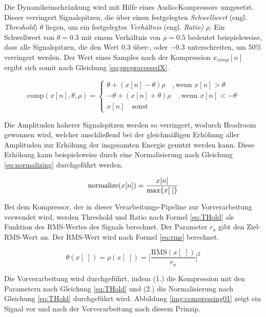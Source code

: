 Die Dynamikeinschränkung wird mit Hilfe eines Audio-Kompressors umgesetzt. Dieser verringert Signalspitzen, die über einen festgelegten \emph{Schwellwert} (engl. \emph{Threshold}) $\theta$ liegen, um ein festgelegtes \emph{Verhältnis} (engl. \emph{Ratio)} $\rho$. Ein Schwellwert von $\theta = 0.3$ mit einem Verhältnis von $\rho = 0.5$ bedeutet beispielsweise, dass alle Signalspitzen, die den Wert 0.3 über-, oder $-0.3$ unterschreiten, um 50\% verringert werden. Der Wert eines Samples nach der Kompression $x_{comp}[n]$ ergibt sich somit nach Gleichung \ref{eq:preprocessedX}.

\begin{equation}
\text{comp}(x[n], \theta, \rho) =
\begin{cases}
\theta + (x[n] - \theta) \rho \quad , \text{wenn } x[n] > \theta \\
-\theta + (x[n] + \theta) \rho \quad, \text{wenn } x[n] < -\theta \\
x[n] \quad \text{sonst}
\end{cases}
\label{eq:preprocessedX}
\end{equation}

Die Amplituden hoherer Signalspitzen werden so verringert, wodurch Headroom gewonnen wird, welcher anschließend bei der gleichmäßigen Erhöhung aller Amplituden zur Erhöhung der insgesamten Energie genutzt werden kann. Diese Erhöhung kann beispielsweise durch eine Normalisierung nach Gleichung \ref{eq:normalizing} durchgeführt werden.

\begin{equation}
\text{normalize}(x[n]) = \frac{x[n]}{\operatorname*{max}\{x[\;]\}}
\label{eq:normalizing}
\end{equation}

Bei dem Kompressor, der in dieser Verarbeitungs-Pipeline zur Vorverarbeitung verwendet wird, werden Threshold und Ratio nach Formel \ref{eq:THold} als Funktion des RMS-Wertes des Signals berechnet. Der Parameter $r_a$ gibt den Ziel-RMS-Wert an. Der RMS-Wert wird nach Formel \ref{eq:rms} berechnet.

\begin{equation}
\theta(x[\;]) = \rho(x[\;])  = \bigg[\frac{\text{RMS}(x[\;])}{r_a}\bigg]^{2}
\label{eq:THold}
\end{equation}

Die Vorverarbeitung wird durchgeführt, indem (1.) die Kompression mit den Parametern nach Gleichung \ref{eq:THold} und (2.) die Normalisierung nach Gleichung \ref{eq:THold} durchgeführt wird. Abbildung \ref{img:compressing01} zeigt ein Signal vor und nach der Vorverarbeitung nach diesem Prinzip.

